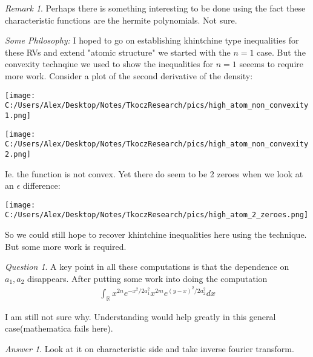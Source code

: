 \documentclass[11pt]{article}
\newcommand{\R}{\mathbb{R}}
\theoremstyle{remark}
\newtheorem*{remark}{Remark}
\newtheorem*{quest}{Question}
\newtheorem*{ans}{Answer}
\begin{document}
\begin{remark}
	Perhaps there is something interesting to be done using the fact these characteristic functions are the hermite polynomials. Not sure.
\end{remark}

\textit{Some Philosophy:} I hoped to go on establishing khintchine type inequalities for these RVs and extend "atomic structure" we started with the $n=1$ case. But the convexity technqiue we used to show the inequalities for $n=1$ seeems to require more work. Consider a plot of the second derivative of the density:

\texttt{[image: C:/Users/Alex/Desktop/Notes/TkoczResearch/pics/high\_atom\_non\_convexity1.png]}

\texttt{[image: C:/Users/Alex/Desktop/Notes/TkoczResearch/pics/high\_atom\_non\_convexity2.png]}

Ie. the function is not convex. Yet there do seem to be 2 zeroes when we look at an $\epsilon$ difference:

\texttt{[image: C:/Users/Alex/Desktop/Notes/TkoczResearch/pics/high\_atom\_2\_zeroes.png]}

So we could still hope to recover khintchine inequalities here using the technique. But some more work is required.

\begin{quest}
	A key point in all these computations is that the dependence on $a_1,a_2$ disappears. After putting some work into doing the computation
	\begin{align*}
		\int_{\R} x^{2n}e^{-x^2/2a_1^2}x^{2m}e^{(y-x)^2/2a_2^2}dx
	\end{align*}

	I am still not sure why. Understanding would help greatly in this general case(mathematica fails here).
\end{quest}

\begin{ans}
	Look at it on characteristic side and take inverse fourier transform.
\end{ans}
\end{document}
